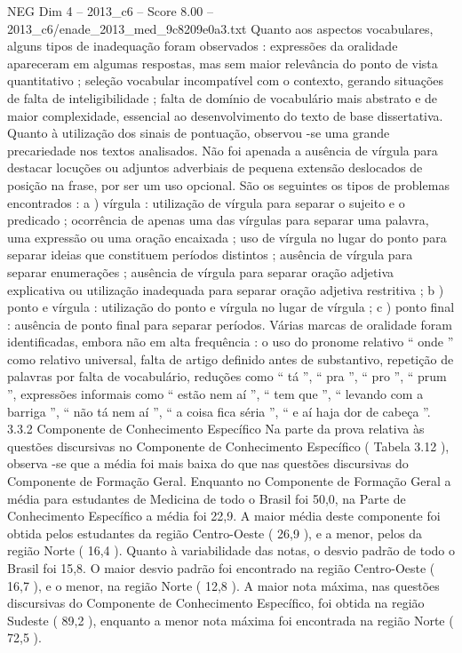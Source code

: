 \begin{textsample}{NEG Dim 4 – 2013\_c6 – Score 8.00 – 2013\_c6/enade\_2013\_med\_9c8209e0a3.txt}
Quanto aos aspectos vocabulares, alguns tipos de inadequação foram observados : expressões da oralidade apareceram em algumas respostas, mas sem maior relevância do ponto de vista quantitativo ; seleção vocabular incompatível com o contexto, gerando situações de falta de inteligibilidade ; falta de domínio de vocabulário mais abstrato e de maior complexidade, essencial ao desenvolvimento do texto de base dissertativa.
Quanto à utilização dos sinais de pontuação, observou -se uma grande precariedade nos textos analisados.
Não foi apenada a ausência de vírgula para destacar locuções ou adjuntos adverbiais de pequena extensão deslocados de posição na frase, por ser um uso opcional.
São os seguintes os tipos de problemas encontrados : a ) vírgula : utilização de vírgula para separar o sujeito e o predicado ; ocorrência de apenas uma das vírgulas para separar uma palavra, uma expressão ou uma oração encaixada ; uso de vírgula no lugar do ponto para separar ideias que constituem períodos distintos ; ausência de vírgula para separar enumerações ; ausência de vírgula para separar oração adjetiva explicativa ou utilização inadequada para separar oração adjetiva restritiva ; b ) ponto e vírgula : utilização do ponto e vírgula no lugar de vírgula ; c ) ponto final : ausência de ponto final para separar períodos.
Várias marcas de oralidade foram identificadas, embora não em alta frequência : o uso do pronome relativo “ onde ” como relativo universal, falta de artigo definido antes de substantivo, repetição de palavras por falta de vocabulário, reduções como “ tá ”, “ pra ”, “ pro ”, “ prum ”, expressões informais como “ estão nem aí ”, “ tem que ”, “ levando com a barriga ”, “ não tá nem aí ”, “ a coisa fica séria ”, “ e aí haja dor de cabeça ”. 3.3.2 Componente de Conhecimento Específico Na parte da prova relativa às questões discursivas no Componente de Conhecimento Específico ( Tabela 3.12 ), observa -se que a média foi mais baixa do que nas questões discursivas do Componente de Formação Geral.
Enquanto no Componente de Formação Geral a média para estudantes de Medicina de todo o Brasil foi 50,0, na Parte de Conhecimento Específico a média foi 22,9.
A maior média deste componente foi obtida pelos estudantes da região Centro-Oeste ( 26,9 ), e a menor, pelos da região Norte ( 16,4 ).
Quanto à variabilidade das notas, o desvio padrão de todo o Brasil foi 15,8.
O maior desvio padrão foi encontrado na região Centro-Oeste ( 16,7 ), e o menor, na região Norte ( 12,8 ).
A maior nota máxima, nas questões discursivas do Componente de Conhecimento Específico, foi obtida na região Sudeste ( 89,2 ), enquanto a menor nota máxima foi encontrada na região Norte ( 72,5 ).

\end{textsample}
